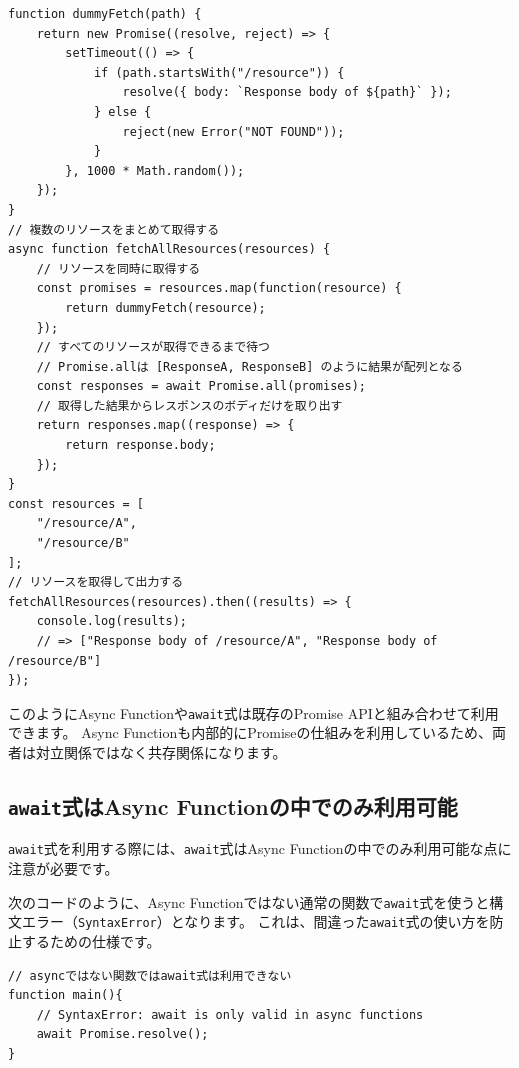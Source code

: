 \begin{lstlisting}
function dummyFetch(path) {
    return new Promise((resolve, reject) => {
        setTimeout(() => {
            if (path.startsWith("/resource")) {
                resolve({ body: `Response body of ${path}` });
            } else {
                reject(new Error("NOT FOUND"));
            }
        }, 1000 * Math.random());
    });
}
// 複数のリソースをまとめて取得する
async function fetchAllResources(resources) {
    // リソースを同時に取得する
    const promises = resources.map(function(resource) {
        return dummyFetch(resource);
    });
    // すべてのリソースが取得できるまで待つ
    // Promise.allは [ResponseA, ResponseB] のように結果が配列となる
    const responses = await Promise.all(promises);
    // 取得した結果からレスポンスのボディだけを取り出す
    return responses.map((response) => {
        return response.body;
    });
}
const resources = [
    "/resource/A",
    "/resource/B"
];
// リソースを取得して出力する
fetchAllResources(resources).then((results) => {
    console.log(results); 
    // => ["Response body of /resource/A", "Response body of /resource/B"]
});
\end{lstlisting}

このようにAsync
Functionや\texttt{await}式は既存のPromise
APIと組み合わせて利用できます。 Async
Functionも内部的にPromiseの仕組みを利用しているため、両者は対立関係ではなく共存関係になります。

\hypertarget{await-in-async-function}{%
\subsection{\texorpdfstring{\texttt{await}式はAsync
Functionの中でのみ利用可能}{await式はAsync Functionの中でのみ利用可能}}\label{await-in-async-function}}

\texttt{await}式を利用する際には、\texttt{await}式はAsync
Functionの中でのみ利用可能な点に注意が必要です。

次のコードのように、Async
Functionではない通常の関数で\texttt{await}式を使うと構文エラー（\texttt{SyntaxError}）となります。
これは、間違った\texttt{await}式の使い方を防止するための仕様です。

\begin{lstlisting}
// asyncではない関数ではawait式は利用できない
function main(){
    // SyntaxError: await is only valid in async functions
    await Promise.resolve();
}
\end{lstlisting}

